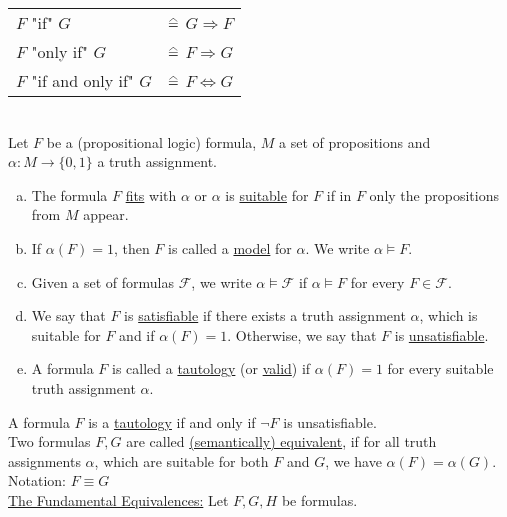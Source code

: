 \documentclass[a4paper]{article}
\renewcommand\hateq{\mathrel{\stackon[1.5pt]{=}{\stretchto{%
				\scalerel*[\widthof{=}]{\wedge}{\rule{1ex}{3ex}}}{0.5ex}}}}
\newcommand{\ul}{\underline}
\begin{document}
\begin{tabular}{ll}
$F$ "if" $G$ & $\hateq$ $G\Rightarrow F$\\
$F$ "only if" $G$ & $\hateq$ $F\Rightarrow G$\\
$F$ "if and only if" $G$ & $\hateq$ $F\Leftrightarrow G$\\
\end{tabular}\\
Let $F$ be a (propositional logic) formula, $M$ a set of propositions and $\alpha:M\rightarrow\{0,1\}$ a truth assignment.
\begin{enumerate}[(a)]
	\item The formula $F$ \ul{fits} with $\alpha$ or $\alpha$ is \ul{suitable} for $F$ if in $F$ only the propositions from $M$ appear.
	\item If $\alpha(F)=1$, then $F$ is called a \ul{model} for $\alpha$. We write $\alpha\models F$.
	\item Given a set of formulas $\mathcal{F}$, we write $\alpha\models \mathcal{F}$ if $\alpha\models F$ for every $F\in\mathcal{F}$.
	\item We say that $F$ is \ul{satisfiable} if there exists a truth assignment $\alpha$, which is suitable for $F$ and if $\alpha(F)=1$. Otherwise, we say that $F$ is \ul{unsatisfiable}.
	\item A formula $F$ is called a \ul{tautology} (or \ul{valid}) if $\alpha(F)=1$ for every suitable truth assignment $\alpha$.
\end{enumerate}
A formula $F$ is a \ul{tautology} if and only if $\neg F$ is unsatisfiable.\\
Two formulas $F,G$ are called \ul{(semantically) equivalent}, if for all truth assignments $\alpha$, which are suitable for both $F$ and $G$, we have $\alpha(F)=\alpha(G)$. Notation: $F\equiv G$\\
\ul{The Fundamental Equivalences:}
Let $F,G,H$ be formulas.
\end{document}
